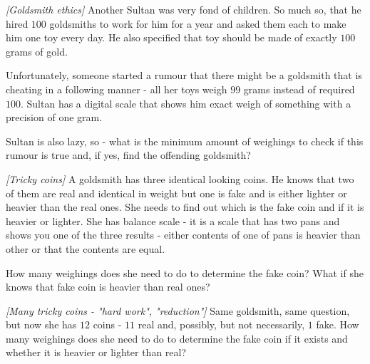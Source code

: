 

%


\noindent 

\begin{problem}
\textit{[Goldsmith ethics]}
Another Sultan was very fond of children. So much so, that he hired $100$ goldsmiths to work for him for a year and asked them each to make him one toy every day. He also specified that toy should be made of exactly $100$ grams of gold.

Unfortunately, someone started a rumour that there might be a goldsmith that is cheating in a following manner - all her toys weigh $99$ grams instead of required $100$. Sultan has a digital scale that shows him exact weigh of something with a precision of one gram. 

Sultan is also lazy, so - what is the minimum amount of weighings to check if this rumour is true and, if yes, find the offending goldsmith?
\end{problem}
%

\begin{problem}
\textit{[Tricky coins]}
A goldsmith has three identical looking coins. He knows that two of them are real and identical in weight but one is fake and is either lighter or heavier than the real ones. She needs to find out which is the fake coin and if it is heavier or lighter.
She has balance scale - it is a scale that has two pans and shows you one of the three results - either contents of one of pans is heavier than other or that the contents are equal.

How many weighings does she need to do to determine the fake coin? What if she knows that fake coin is heavier than real ones?
\end{problem}
%

\begin{problem}
\textit{[Many tricky coins - "hard work", "reduction"]}
Same goldsmith, same question, but now she has $12$ coins - $11$ real and, possibly, but not necessarily, $1$ fake.
How many weighings does she need to do to determine the fake coin if it exists and whether it is heavier or lighter than real? 
\end{problem}
%


